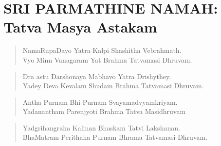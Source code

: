 \begin{verse}
\end{verse}

\begin{verse}
\end{verse}

\begin{verse}
\end{verse}

\begin{center}
\end{center}

\chapter*{SRI PARMATHINE NAMAH:\\ Tatva Masya Astakam}

\begin{verse}
 NamaRupaDayo Yatra Kalpi Shashitha Vebrahmath.\\
 Vyo Minn Vanagaram Yat Brahma Tatvamasi Dhruvam.
\end{verse}

\begin{verse}
 Dra astu Darshonaya Mabhavo Yatra Drishythey.\\
 Yadey Deva Kevalam Shudam Brahma Tatvamasi Dhruvam.
\end{verse}

\begin{verse}
 Antha Purnam Bhi Purnam Svayamadvyamkriyam.\\
 Yadanantham Parenjyoti Brahma Tatva Masidhruvam
\end{verse}

\begin{verse}
 Yadgrihangraha Kalinan Bhaskam Tatvi Lakshanan.\\
 BhaMatram Perithaha Purnam Bhrama Tatvamasi \break Dhruvam.
\end{verse}

